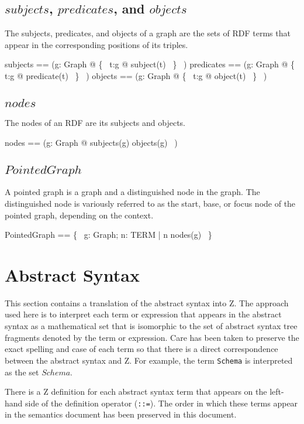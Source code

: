 \documentclass{article}
\begin{document}
\subsection{$subjects$, $predicates$, and $objects$}
The subjects, predicates, and objects of a graph are the sets of RDF terms that appear in the corresponding positions of its triples.
\begin{zed}
	subjects == (\lambda g: Graph @ \{~ t:g @ subject(t) ~\} ~)
\also
	predicates == (\lambda g: Graph @ \{~ t:g @ predicate(t) ~\} ~)
\also
	objects == (\lambda g: Graph @ \{~ t:g @ object(t) ~\} ~)
\end{zed}

\subsection{$nodes$}
The nodes of an RDF are its subjects and objects.
\begin{zed}
	nodes == (\lambda g: Graph @ subjects(g) \cup objects(g) ~)
\end{zed}

\subsection{$PointedGraph$}
A pointed graph is a graph and a distinguished node in the graph.
The distinguished node is variously referred to as the start, base, or focus node of the pointed graph, depending on the context.
\begin{zed}
	PointedGraph == \{~ g: Graph; n: TERM | n \in nodes(g) ~\}
\end{zed}

\section{Abstract Syntax}
\label{sec-abstract-syntax}
This section contains a translation of the abstract syntax into Z.
The approach used here is to interpret each term or expression that appears in the abstract syntax as
a mathematical set that is isomorphic to the set of abstract syntax tree fragments denoted by the term or expression.
Care has been taken to preserve the exact spelling and case of each term so that there is a direct correspondence
between the abstract syntax and Z.
For example, the term {\tt Schema} is interpreted as the set $Schema$.

There is a Z definition for each abstract syntax term that appears on the left-hand side of the definition operator ({\tt ::=}).
The order in which these terms appear in the semantics document has been preserved in this document.
\end{document}

